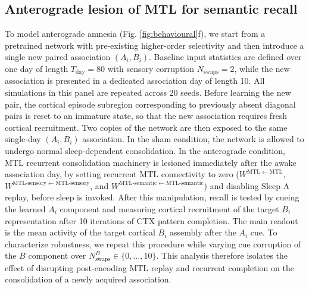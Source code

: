 \documentclass{article}
\begin{document}
\subsection*{Anterograde lesion of MTL for semantic recall}
To model anterograde amnesia (Fig. \ref{fig:behavioural}f), we start from a pretrained network with pre-existing higher-order selectivity and then introduce a single new paired association $(A_i,B_i)$. Baseline input statistics are defined over one day of length $T_\mathrm{day}=80$ with sensory corruption $N_\mathrm{swaps}=2$, while the new association is presented in a dedicated association day of length 10. All simulations in this panel are repeated across 20 seeds.
\newline\newline
Before learning the new pair, the cortical episode subregion corresponding to previously absent diagonal pairs is reset to an immature state, so that the new association requires fresh cortical recruitment. Two copies of the network are then exposed to the same single-day $(A_i,B_i)$ association. In the sham condition, the network is allowed to undergo normal sleep-dependent consolidation. In the anterograde condition, MTL recurrent consolidation machinery is lesioned immediately after the awake association day, by setting recurrent MTL connectivity to zero ($W^{\mathrm{MTL}\leftarrow \mathrm{MTL}}$, $W^{\mathrm{MTL\text{-}sensory}\leftarrow \mathrm{MTL\text{-}sensory}}$, and $W^{\mathrm{MTL\text{-}semantic}\leftarrow \mathrm{MTL\text{-}semantic}}$) and disabling Sleep A replay, before sleep is invoked.
\newline\newline
After this manipulation, recall is tested by cueing the learned $A_i$ component and measuring cortical recruitment of the target $B_i$ representation after 10 iterations of CTX pattern completion. The main readout is the mean activity of the target cortical $B_i$ assembly after the $A_i$ cue. To characterize robustness, we repeat this procedure while varying cue corruption of the $B$ component over $N_\mathrm{swaps}^B\in\{0,\dots,10\}$. This analysis therefore isolates the effect of disrupting post-encoding MTL replay and recurrent completion on the consolidation of a newly acquired association.
\end{document}
